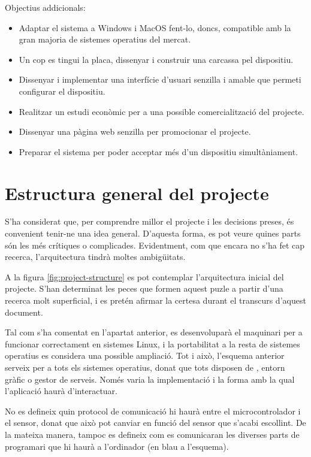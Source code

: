 Objectius addicionals:
\begin{itemize}
    \item Adaptar el sistema a Windows i MacOS fent-lo, doncs, compatible amb la
    gran majoria de sistemes operatius del mercat.
    \item Un cop es tingui la placa, dissenyar i construir una carcassa pel
    dispositiu.
    \item Dissenyar i implementar una interfície d'usuari senzilla i amable
    que permeti configurar el dispositiu.
    \item Realitzar un estudi econòmic per a una possible comercialització del
    projecte.
    \item Dissenyar una pàgina web senzilla per promocionar el projecte.
    \item Preparar el sistema per poder acceptar més d'un dispositiu
    simultàniament.
\end{itemize}

\section{Estructura general del projecte}

S'ha considerat que, per comprendre millor el projecte i les decisions preses,
és convenient tenir-ne una idea general. D'aquesta forma, es pot veure
quines parts són les més crítiques o complicades. Evidentment, com que encara no
s'ha fet cap recerca, l'arquitectura tindrà moltes ambigüitats.

A la figura \ref{fig:project-structure} es pot contemplar l'arquitectura inicial
del projecte. S'han determinat les peces que formen aquest puzle a partir d'una
recerca molt superficial, i es pretén afirmar la certesa durant el transcurs
d'aquest document.



Tal com s'ha comentat en l'apartat anterior, es desenvoluparà el maquinari per
a funcionar correctament en sistemes Linux, i la portabilitat a la resta de
sistemes operatius es considera una possible ampliació. Tot i això, l'esquema
anterior serveix per a tots els sistemes operatius, donat que tots disposen de
, entorn gràfic o gestor de serveis. Només varia la implementació i
la forma amb la qual l'aplicació haurà d'interactuar.

No es defineix quin protocol de comunicació hi haurà entre el microcontrolador
i el sensor, donat que això pot canviar en funció del sensor que s'acabi
escollint. De la mateixa manera, tampoc es defineix com es comunicaran les
diverses parts de programari que hi haurà a l'ordinador (en blau a l'esquema).

